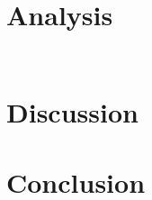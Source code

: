 \documentclass[prb,preprint]{revtex4-1}
\begin{document}
\section{Analysis}

\begin{table}[h!]
\centering
\caption{ }
\begin{ruledtabular}
\begin{tabular}{lc}
     
\end{tabular}
\end{ruledtabular}
\label{parameters}
\end{table}


\section{Discussion}


\section{Conclusion}

\begin{thebibliography}{3}

\end{thebibliography}
\end{document}
